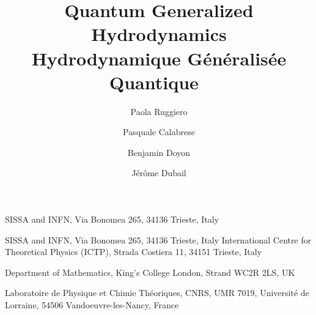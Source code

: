 \documentclass[twocolumn,amsfonts,showpacs,superscriptaddress]{revtex4-1}
\newcommand{\trad}[1]{\textcolor{myblue}{#1}}
\begin{document}
\title{Quantum Generalized Hydrodynamics\\
\trad{Hydrodynamique Généralisée Quantique} }



\author{Paola Ruggiero}
\affiliation
{SISSA and INFN, Via Bonomea 265, 34136 Trieste, Italy}
\author{Pasquale Calabrese}
\affiliation
{SISSA and INFN, Via Bonomea 265, 34136 Trieste, Italy}
\affiliation
{International Centre for Theoretical Physics (ICTP), Strada Costiera 11, 34151 Trieste, Italy}
\author{Benjamin Doyon}
\affiliation
{Department of Mathematics, King’s College London, Strand WC2R 2LS, UK}
\author{J\'er\^ome Dubail}
\affiliation
{Laboratoire de Physique et Chimie Th\'eoriques, CNRS, UMR 7019, Universit\'e de Lorraine, 54506 Vandoeuvre-les-Nancy, France
}
\end{document}
